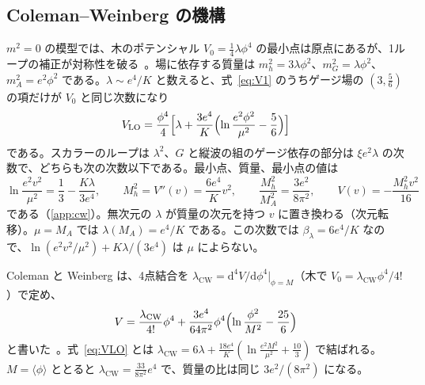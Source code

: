 \documentclass[a4paper,10pt]{ltjsarticle}
\newcommand{\dd}{\mathrm{d}}
\begin{document}
\subsection{Coleman--Weinberg の機構}\label{sec:cw}

$m^2=0$ の模型では、木のポテンシャル $V_0=\frac14\lambda\phi^4$ の最小点は原点にあるが、1ループの補正が対称性を破る~\cite{cw73}。場に依存する質量は $m_h^2=3\lambda\phi^2$、$m_G^2=\lambda\phi^2$、$m_A^2=e^2\phi^2$ である。$\lambda\sim e^4/K$ と数えると、式~\eqref{eq:V1} のうちゲージ場の $(3,\frac56)$ の項だけが $V_0$ と同じ次数になり
\begin{equation}
V_{\mathrm{LO}}=\frac{\phi^4}4\Bigl[\lambda+\frac{3e^4}K\Bigl(\ln\frac{e^2\phi^2}{\mu^2}-\frac56\Bigr)\Bigr]
\label{eq:VLO}
\end{equation}
である。スカラーのループは $\lambda^2$、$G$ と縦波の組のゲージ依存の部分は $\xi e^2\lambda$ の次数で、どちらも次の次数以下である。最小点、質量、最小点の値は
\begin{equation}
\ln\frac{e^2v^2}{\mu^2}=\frac13-\frac{K\lambda}{3e^4},\qquad
M_h^2=V''(v)=\frac{6e^4}Kv^2,\qquad
\frac{M_h^2}{M_A^2}=\frac{3e^2}{8\pi^2},\qquad
V(v)=-\frac{M_h^2v^2}{16}
\label{eq:cw}
\end{equation}
である（\ref{app:cw}）。無次元の $\lambda$ が質量の次元を持つ $v$ に置き換わる（次元転移）。$\mu=M_A$ では $\lambda(M_A)=e^4/K$ である。この次数では $\beta_\lambda=6e^4/K$ なので、$\ln(e^2v^2/\mu^2)+K\lambda/(3e^4)$ は $\mu$ によらない。

Coleman と Weinberg は、4点結合を $\lambda_{\mathrm{CW}}=\dd^4V/\dd\phi^4|_{\phi=M}$（木で $V_0=\lambda_{\mathrm{CW}}\phi^4/4!$）で定め、
\begin{equation*}
V=\frac{\lambda_{\mathrm{CW}}}{4!}\phi^4+\frac{3e^4}{64\pi^2}\phi^4\Bigl(\ln\frac{\phi^2}{M^2}-\frac{25}6\Bigr)
\end{equation*}
と書いた~\cite{cw73}。式~\eqref{eq:VLO} とは $\lambda_{\mathrm{CW}}=6\lambda+\frac{18e^4}K(\ln\frac{e^2M^2}{\mu^2}+\frac{10}3)$ で結ばれる。$M=\langle\phi\rangle$ ととると $\lambda_{\mathrm{CW}}=\frac{33}{8\pi^2}e^4$ で、質量の比は同じ $3e^2/(8\pi^2)$ になる。
\end{document}
